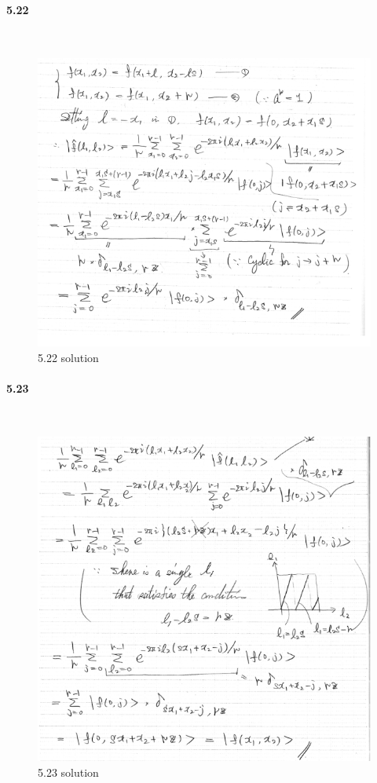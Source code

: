 \paragraph{5.22} \textbf{}
\\
\begin{figure}[h!]
    \centering
    \includegraphics{Chapter 5/Ex 5.22 soln.png}
    \caption{5.22 solution}
    \label{fig:my_label}
\end{figure}

\paragraph{5.23} \textbf{}
\\
\begin{figure}[h!]
    \centering
    \includegraphics{Chapter 5/Ex 5.23 soln.png}
    \caption{5.23 solution}
    \label{fig:my_label}
\end{figure}
